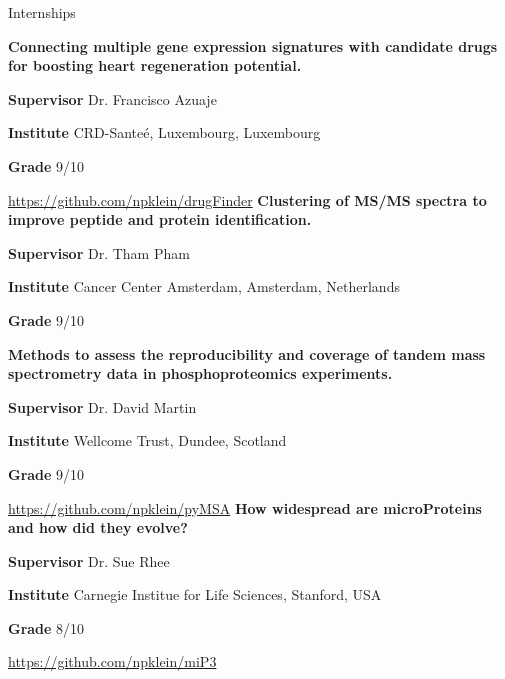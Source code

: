 
\begin{rubric}{Internships}
	
	\textbf{Connecting multiple gene expression signatures with candidate drugs for boosting heart regeneration potential.} \par
	\textbf{Supervisor} Dr. Francisco Azuaje \par
	\textbf{Institute} CRD-Sante\'e, Luxembourg, Luxembourg \par
	\textbf{Grade} 9/10 \par
	\url{https://github.com/npklein/drugFinder}
	\textbf{Clustering of MS/MS spectra to improve peptide and protein identification.} \par
	\textbf{Supervisor} Dr. Tham Pham \par
	\textbf{Institute} Cancer Center Amsterdam, Amsterdam, Netherlands\par
	\textbf{Grade} 9/10 \par

	
	
	\textbf{Methods to assess the reproducibility and coverage of tandem mass spectrometry data in phosphoproteomics experiments.} \par
	\textbf{Supervisor} Dr. David Martin \par
	\textbf{Institute} Wellcome Trust, Dundee, Scotland \par
	\textbf{Grade} 9/10 \par
	\url{https://github.com/npklein/pyMSA}
	\textbf{How widespread are microProteins and how did they evolve?} \par
	\textbf{Supervisor} Dr. Sue Rhee \par
	\textbf{Institute} Carnegie Institue for Life Sciences, Stanford, USA \par
	\textbf{Grade} 8/10 \par
	\url{https://github.com/npklein/miP3}
	
	
\end{rubric}